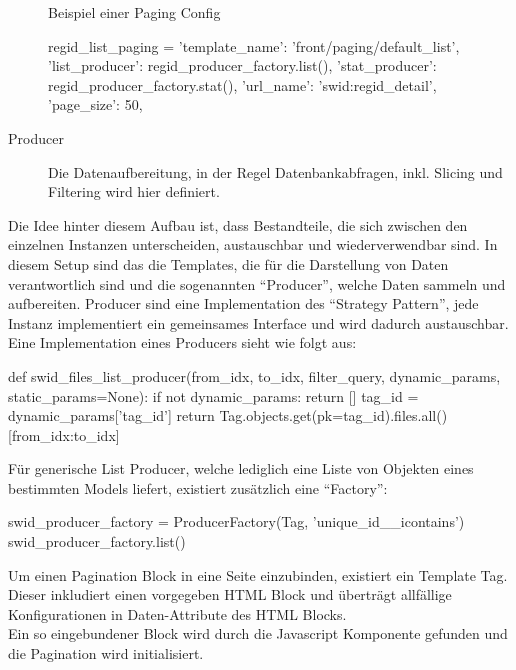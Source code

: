 \begin{description}
\begin{listing}
\caption{Beispiel einer Paging Config}
\begin{pythoncode}
regid_list_paging = {
    'template_name': 'front/paging/default_list',
    'list_producer': regid_producer_factory.list(),
    'stat_producer': regid_producer_factory.stat(),
    'url_name': 'swid:regid_detail',
    'page_size': 50,
}
\end{pythoncode}
\end{listing}

\item[Producer]
Die Datenaufbereitung, in der Regel Datenbankabfragen, inkl. Slicing und Filtering wird hier definiert.

\end{description}

Die Idee hinter diesem Aufbau ist, dass Bestandteile, die sich zwischen den einzelnen
Instanzen unterscheiden, austauschbar und wiederverwendbar sind. In diesem Setup sind das die Templates, die für die Darstellung von Daten verantwortlich sind und die sogenannten \enquote{Producer}, welche Daten sammeln und aufbereiten.
Producer sind eine Implementation des \enquote{Strategy Pattern}, jede Instanz
implementiert ein gemeinsames Interface und wird dadurch austauschbar.\\
Eine Implementation eines Producers sieht wie folgt aus:

\begin{pythoncode}
def swid_files_list_producer(from_idx, to_idx, filter_query, dynamic_params, static_params=None):
    if not dynamic_params:
        return []
    tag_id = dynamic_params['tag_id']
    return Tag.objects.get(pk=tag_id).files.all()[from_idx:to_idx]
\end{pythoncode}

Für generische List Producer, welche lediglich eine Liste von Objekten eines
bestimmten Models liefert, existiert zusätzlich eine \enquote{Factory}:

\begin{pythoncode}
swid_producer_factory = ProducerFactory(Tag, 'unique_id__icontains')
swid_producer_factory.list()
\end{pythoncode}

Um einen Pagination Block in eine Seite einzubinden, existiert ein Template Tag.
Dieser inkludiert einen vorgegeben HTML Block und überträgt allfällige
Konfigurationen in Daten-Attribute des HTML Blocks.\\
Ein so eingebundener Block wird durch die Javascript Komponente gefunden und die
Pagination wird initialisiert.

